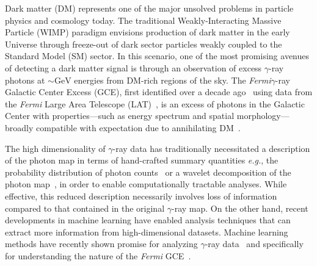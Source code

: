 \documentclass[]{article}
\newcommand{\Fermi}{\emph{Fermi}\xspace}
\begin{document}
Dark matter (DM) represents one of the major unsolved problems in particle physics and cosmology today. The traditional Weakly-Interacting Massive Particle (WIMP) paradigm envisions production of dark matter in the early Universe through freeze-out of dark sector particles weakly coupled to the Standard Model (SM) sector. In this scenario, one of the most promising avenues of detecting a dark matter signal is through an observation of excess $\gamma$-ray photons at $\sim\mathrm{GeV}$ energies from DM-rich regions of the sky.  The \Fermi $\gamma$-ray Galactic Center Excess (GCE), first identified over a decade ago~\cite{Goodenough:2009gk,Hooper:2010mq,Boyarsky:2010dr,Hooper:2011ti} using data from the \Fermi Large Area Telescope (LAT)~\cite{Atwood:2009ez}, is an excess of photons in the Galactic Center with properties---such as energy spectrum and spatial morphology---broadly compatible with expectation due to annihilating DM~\cite{Daylan:2014rsa,Calore:2014xka}.%

The high dimensionality of $\gamma$-ray data has traditionally necessitated a description of the photon map in terms of hand-crafted summary quantities \emph{e.g.}, the probability distribution of photon counts~\cite{Lee:2014mza,Lee:2015fea} or a wavelet decomposition of the photon map~\cite{Bartels:2015aea,Balaji:2018rwz,McDermott:2015ydv,Zhong:2019ycb}, in order to enable computationally tractable analyses. While effective, this reduced description necessarily involves loss of information compared to that contained in the original $\gamma$-ray map. On the other hand, recent developments in machine learning have enabled analysis techniques that can extract more information from high-dimensional datasets. Machine learning methods have recently shown promise for analyzing $\gamma$-ray data~\cite{Caron:2021map} and specifically for understanding the nature of the \Fermi GCE~\cite{List:2020mzd,List:2021aer,Caron:2017udl}.
\end{document}
